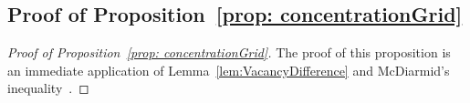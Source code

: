 \documentclass[11pt]{article}
\newcommand{\var}{\mathrm{Var}}
\begin{document}



\subsection{Proof of Proposition~\ref{prop: concentrationGrid}}
\begin{proof}[Proof of Proposition~\ref{prop: concentrationGrid}] 
The proof of this proposition is an immediate application of Lemma~\ref{lem:VacancyDifference} and McDiarmid's inequality~\citep{mcdiarmid1989method}.
\end{proof}
\end{document}

